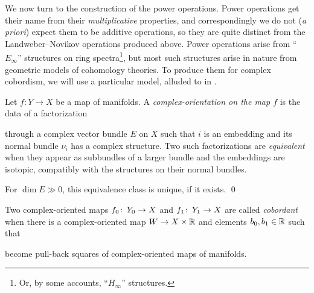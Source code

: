 We now turn to the construction of the power operations.  Power operations get their name from their \emph{multiplicative} properties, and correspondingly we do not (\textit{a priori}) expect them to be additive operations, so they are quite distinct from the Landweber--Novikov operations produced above.  Power operations arise from ``$E_\infty$'' structures on ring spectra\footnote{Or, by some accounts, ``$H_\infty$'' structures.}, but most such structures arise in nature from geometric models of cohomology theories.  To produce them for complex cobordism, we will use a particular model, alluded to in .

\begin{definition}
Let $f: Y \to X$ be a map of manifolds.  A \textit{complex-orientation on the map $f$} is the data of a factorization
\begin{center}
\end{center}
through a complex vector bundle $E$ on $X$ such that $i$ is an embedding and its normal bundle $\nu_i$ has a complex structure.  Two such factorizations are \textit{equivalent} when they appear as subbundles of a larger bundle and the embeddings are isotopic, compatibly with the structures on their normal bundles.
\end{definition}
\begin{lemma}
For $\dim E \gg 0$, this equivalence class is unique, if it exists. \qed
\end{lemma}
\begin{definition}
Two complex-oriented maps $f_0\colon\thinspace Y_0 \to X$ and $f_1\colon\thinspace Y_1 \to X$ are called \textit{cobordant} when there is a complex-oriented map $W \to X \times \mathbb R$ and elements $b_0, b_1 \in \mathbb R$ such that
\begin{center}
\end{center}
become pull-back squares of complex-oriented maps of manifolds.
\end{definition}

